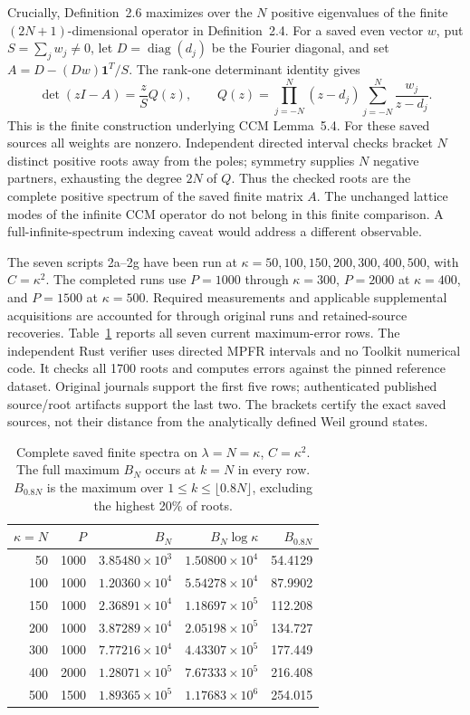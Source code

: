 \documentclass[11pt,a4paper]{article}
\begin{document}
Crucially, Definition~2.6 maximizes over the $N$ positive eigenvalues
of the finite $(2N+1)$-dimensional operator in Definition~2.4.
For a saved even vector $w$, put $S=\sum_j w_j\ne0$, let
$D=\operatorname{diag}(d_j)$ be the Fourier diagonal, and set
$A=D-(Dw)\mathbf1^T/S$. The rank-one determinant identity gives
\[
 \det(zI-A)=\frac{z}{S}Q(z),\qquad
 Q(z)=\prod_{j=-N}^N(z-d_j)\sum_{j=-N}^N\frac{w_j}{z-d_j}.
\]
This is the finite construction underlying CCM Lemma~5.4.
For these saved sources all weights are nonzero. Independent directed
interval checks bracket $N$ distinct positive roots away from the poles;
symmetry supplies $N$ negative partners, exhausting the degree $2N$ of
$Q$. Thus the checked roots are the complete positive spectrum of the
saved finite matrix $A$. The unchanged lattice modes of the infinite
CCM operator do not belong in this finite comparison. A full-infinite-spectrum
indexing caveat would address a different observable.

The seven scripts 2a--2g have been run at
$\kappa=50,100,150,200,300,400,500$, with $C=\kappa^2$.
The completed runs use $P=1000$ through $\kappa=300$, $P=2000$
at $\kappa=400$, and $P=1500$ at $\kappa=500$.
Required measurements and applicable supplemental acquisitions are
accounted for through original runs and retained-source recoveries.
Table~\ref{tab:kappa} reports all seven current maximum-error rows.
The independent Rust verifier uses directed MPFR intervals and no
Toolkit numerical code. It checks all 1700 roots and computes errors
against the pinned reference dataset. Original journals support the
first five rows; authenticated published source/root artifacts support
the last two. The brackets certify the exact saved sources, not their
distance from the analytically defined Weil ground states.

\begin{table}[htbp]
\centering\small
\caption{Complete saved finite spectra on $\lambda=N=\kappa$,
$C=\kappa^2$. The full maximum $B_N$ occurs at $k=N$ in every row.
$B_{0.8N}$ is the maximum over $1\leq k\leq\lfloor0.8N\rfloor$,
excluding the highest 20\% of roots.}
\label{tab:kappa}
\begin{tabular}{@{}rrrrr@{}}
\toprule
$\kappa=N$ & $P$ & $B_N$ & $B_N\log\kappa$ & $B_{0.8N}$ \\
\midrule
50 & 1000 & $3.85480\times10^3$ & $1.50800\times10^4$ & 54.4129 \\
100 & 1000 & $1.20360\times10^4$ & $5.54278\times10^4$ & 87.9902 \\
150 & 1000 & $2.36891\times10^4$ & $1.18697\times10^5$ & 112.208 \\
200 & 1000 & $3.87289\times10^4$ & $2.05198\times10^5$ & 134.727 \\
300 & 1000 & $7.77216\times10^4$ & $4.43307\times10^5$ & 177.449 \\
400 & 2000 & $1.28071\times10^5$ & $7.67333\times10^5$ & 216.408 \\
500 & 1500 & $1.89365\times10^5$ & $1.17683\times10^6$ & 254.015 \\
\bottomrule
\end{tabular}
\end{table}
\end{document}
